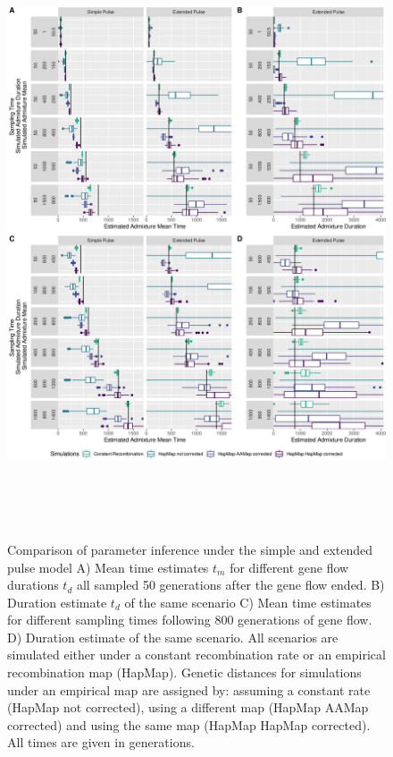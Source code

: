 \documentclass[11pt]{article}
\begin{document}
\begin{figure}
\centering
\includegraphics[width=16cm,height=18cm,keepaspectratio]{Admixture_Time_Inference_Paper_Draft_files/figure-latex/fig4-1.pdf}
\caption{\label{fig:figResult3_4_supplements} Comparison of parameter inference under the simple and extended pulse model  A) Mean time estimates $t_m$ for different gene
flow durations $t_d$ all sampled 50 generations after the gene flow ended. B)
Duration estimate $t_d$ of the same scenario C) Mean time estimates for different sampling times following 800
generations of gene flow. D) Duration estimate of the same scenario. All scenarios are simulated either under a constant recombination rate or an empirical recombination map (HapMap). Genetic distances for simulations under an empirical map are assigned by: assuming a constant rate (HapMap not corrected), using a different map (HapMap AAMap corrected) and using the same map (HapMap HapMap corrected). All times are given in generations.}
\end{figure}
\end{document}
